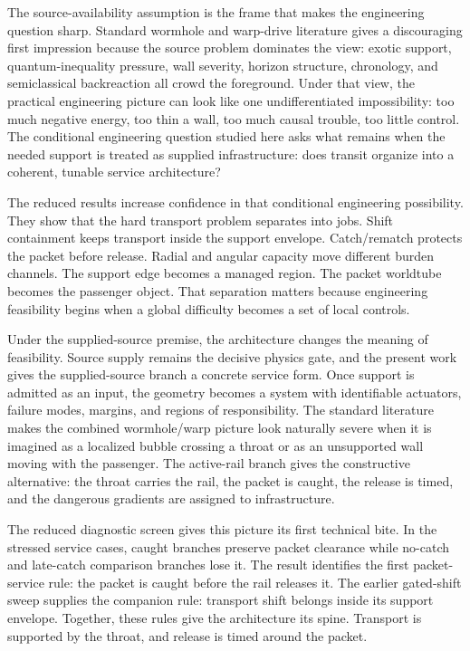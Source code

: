 \documentclass[11pt]{article}
\begin{document}
The source-availability assumption is the frame that makes the engineering question sharp. Standard wormhole and warp-drive literature gives a discouraging first impression because the source problem dominates the view: exotic support, quantum-inequality pressure, wall severity, horizon structure, chronology, and semiclassical backreaction all crowd the foreground. Under that view, the practical engineering picture can look like one undifferentiated impossibility: too much negative energy, too thin a wall, too much causal trouble, too little control. The conditional engineering question studied here asks what remains when the needed support is treated as supplied infrastructure: does transit organize into a coherent, tunable service architecture?

The reduced results increase confidence in that conditional engineering possibility. They show that the hard transport problem separates into jobs. Shift containment keeps transport inside the support envelope. Catch/rematch protects the packet before release. Radial and angular capacity move different burden channels. The support edge becomes a managed region. The packet worldtube becomes the passenger object. That separation matters because engineering feasibility begins when a global difficulty becomes a set of local controls.

Under the supplied-source premise, the architecture changes the meaning of feasibility. Source supply remains the decisive physics gate, and the present work gives the supplied-source branch a concrete service form. Once support is admitted as an input, the geometry becomes a system with identifiable actuators, failure modes, margins, and regions of responsibility. The standard literature makes the combined wormhole/warp picture look naturally severe when it is imagined as a localized bubble crossing a throat or as an unsupported wall moving with the passenger. The active-rail branch gives the constructive alternative: the throat carries the rail, the packet is caught, the release is timed, and the dangerous gradients are assigned to infrastructure.

The reduced diagnostic screen gives this picture its first technical bite. In the stressed service cases, caught branches preserve packet clearance while no-catch and late-catch comparison branches lose it. The result identifies the first packet-service rule: the packet is caught before the rail releases it. The earlier gated-shift sweep supplies the companion rule: transport shift belongs inside its support envelope. Together, these rules give the architecture its spine. Transport is supported by the throat, and release is timed around the packet.
\end{document}
